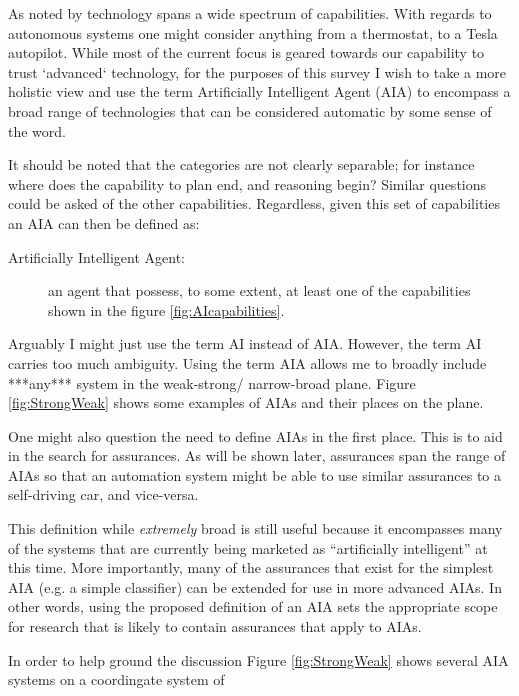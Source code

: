     As noted by \cite{Tripp2011-cq} technology spans a wide spectrum of capabilities. With regards to autonomous systems one might consider anything from a thermostat, to a Tesla autopilot. While most of the current focus is geared towards our capability to trust `advanced` technology, for the purposes of this survey I wish to take a more holistic view and use the term Artificially Intelligent Agent (AIA) to encompass a broad range of technologies that can be considered automatic by some sense of the word.

    It should be noted that the categories are not clearly separable; for instance where does the capability to plan end, and reasoning begin? Similar questions could be asked of the other capabilities. Regardless, given this set of capabilities an AIA can then be defined as:
    
    \begin{description}
        \item[Artificially Intelligent Agent:] an agent that possess, to some extent, at least one of the capabilities shown in the figure \ref{fig:AIcapabilities}. 
    \end{description}

    Arguably I might just use the term AI instead of AIA. However, the term AI carries too much ambiguity. Using the term AIA allows me to broadly include ***any*** system in the weak-strong/ narrow-broad plane. Figure \ref{fig:StrongWeak} shows some examples of AIAs and their places on the plane.

    One might also question the need to define AIAs in the first place. This is to aid in the search for assurances. As will be shown later, assurances span the range of AIAs so that an automation system might be able to use similar assurances to a self-driving car, and vice-versa. 

    This definition while \emph{extremely} broad is still useful because it encompasses many of the systems that are currently being marketed as ``artificially intelligent'' at this time. More importantly, many of the assurances that exist for the simplest AIA (e.g. a simple classifier) can be extended for use in more advanced AIAs. In other words, using the proposed definition of an AIA sets the appropriate scope for research that is likely to contain assurances that apply to AIAs.

    In order to help ground the discussion Figure \ref{fig:StrongWeak} shows several AIA systems on a coordingate system of 

